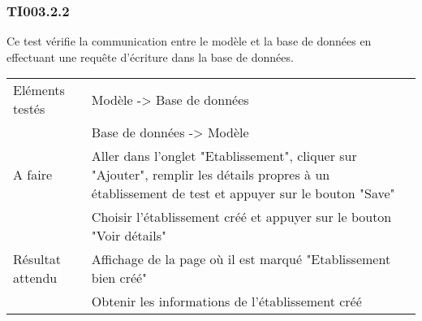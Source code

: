   		
  	\subsubsection{TI003.2.2}
  	\label{TI003.2.2}
  		Ce test vérifie la communication entre le modèle et la base de données en effectuant une requête d'écriture dans la base de données.
  		\begin{center}
    	 		\begin{tabular}[h]{|p{}|p{}|}
			\hline
				Eléments testés & Modèle -> Base de données  \\
							    &  Base de données -> Modèle \\\hline
    				A faire & Aller dans l’onglet "Etablissement", cliquer
sur "Ajouter", remplir les détails propres
à un établissement de test et appuyer sur le
bouton "Save"\\
    						& Choisir l'établissement créé et appuyer sur le
bouton "Voir détails" \\\hline
    				Résultat attendu & Affichage de la page où il est marqué "Etablissement bien créé" \\
    								 & Obtenir les informations de l'établissement créé \\\hline
     		\end{tabular}
  		\end{center}	
  		